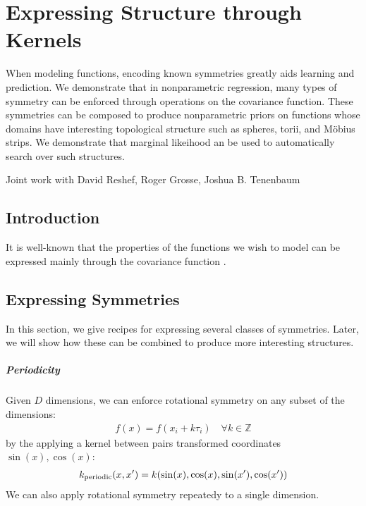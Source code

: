
\inbpdocument




\chapter{Expressing Structure through Kernels}
\label{ch:kernels}




When modeling functions, encoding known symmetries greatly aids learning and prediction.  We demonstrate that in nonparametric regression, many types of symmetry can be enforced through operations on the covariance function.  These symmetries can be composed to produce nonparametric priors on functions whose domains have interesting topological structure such as spheres, torii, and M\"{o}bius strips.  We demonstrate that marginal likeihood an be used to automatically search over such structures.

Joint work with David Reshef, Roger Grosse, Joshua B. Tenenbaum

\section{Introduction}


It is well-known that the properties of the functions we wish to model can be expressed mainly through the covariance function \cite{rasmussen38gaussian}.

\section{Expressing Symmetries}

In this section, we give recipes for expressing several classes of symmetries.  Later, we will show how these can be combined to produce more interesting structures.

\paragraph{Periodicity}
Given $D$ dimensions, we can enforce rotational symmetry on any subset of the dimensions:
%
\begin{align}
f(x) = f( x_i + k \tau_i) \quad \forall k \in \mathbb{Z}
\end{align}
%
by the applying a kernel between pairs transformed coordinates $\sin(x), \cos(x)$:
%
\begin{align}
k_{\textnormal{periodic}}(x, x') = k(\sin(x), \cos(x), \sin(x'), \cos(x'))
\end{align}
%
We can also apply rotational symmetry repeatedy to a single dimension.

